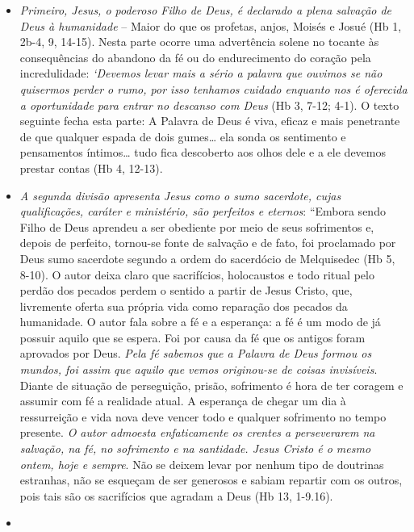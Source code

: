 \documentclass[
]{book}
\begin{document}
\begin{itemize}
\item
  \emph{Primeiro, Jesus, o poderoso Filho de Deus, é declarado a plena salvação de Deus à humanidade} -- Maior do que os profetas, anjos, Moisés e Josué (Hb 1, 2b-4, 9, 14-15). Nesta parte ocorre uma advertência solene no tocante às consequências do abandono da fé ou do endurecimento do coração pela incredulidade: \emph{`Devemos levar mais a sério a palavra que ouvimos se não quisermos perder o rumo, por isso tenhamos cuidado enquanto nos é oferecida a oportunidade para entrar no descanso com Deus} (Hb 3, 7-12; 4-1). O texto seguinte fecha esta parte: A Palavra de Deus é viva, eficaz e mais penetrante de que qualquer espada de dois gumes\ldots{} ela sonda os sentimento e pensamentos íntimos\ldots{} tudo fica descoberto aos olhos dele e a ele devemos prestar contas (Hb 4, 12-13).
\item
  \emph{A segunda divisão apresenta Jesus como o sumo sacerdote, cujas qualificações, caráter e ministério, são perfeitos e eternos}: ``Embora sendo Filho de Deus aprendeu a ser obediente por meio de seus sofrimentos e, depois de perfeito, tornou-se fonte de salvação e de fato, foi proclamado por Deus sumo sacerdote segundo a ordem do sacerdócio de Melquisedec (Hb 5, 8-10). O autor deixa claro que sacrifícios, holocaustos e todo ritual pelo perdão dos pecados perdem o sentido a partir de Jesus Cristo, que, livremente oferta sua própria vida como reparação dos pecados da humanidade. O autor fala sobre a fé e a esperança: a fé é um modo de já possuir aquilo que se espera. Foi por causa da fé que os antigos foram aprovados por Deus. \emph{Pela fé sabemos que a Palavra de Deus formou os mundos, foi assim que aquilo que vemos originou-se de coisas invisíveis}. Diante de situação de perseguição, prisão, sofrimento é hora de ter coragem e assumir com fé a realidade atual. A esperança de chegar um dia à ressurreição e vida nova deve vencer todo e qualquer sofrimento no tempo presente. \emph{O autor admoesta enfaticamente os crentes a perseverarem na salvação, na fé, no sofrimento e na santidade. Jesus Cristo é o mesmo ontem, hoje e sempre}. Não se deixem levar por nenhum tipo de doutrinas estranhas, não se esqueçam de ser generosos e sabiam repartir com os outros, pois tais são os sacrifícios que agradam a Deus (Hb 13, 1-9.16).
\item

\end{itemize}
\end{document}
